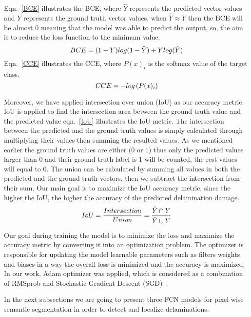 \documentclass[preprint,10pt]{elsarticle}
\begin{document}
Eqn.~\ref{BCE} illustrates the BCE, where \(\hat{Y}\) represents the predicted vector values and \(Y\) represents the ground truth vector values, when \(\hat{Y} \approx Y\) then the BCE will be almost \(0\) meaning that the model was able to predict the output, so, the aim is to reduce the loss function to the minimum value.
\begin{equation}
\footnotesize
	BCE = (1-Y)log(1-\hat{Y})+Ylog(\hat{Y})
	\label{BCE}
\end{equation}
Eqn.~\ref{CCE} illustrates the CCE, where \( P(x)_{i}\) is the softmax value of the target class. 
\begin{equation}
\footnotesize
CCE = -log\left( P(x)_{i} \right)
\label{CCE}
\end{equation}

Moreover, we have applied intersection over union (IoU) as our accuracy metric. 
IoU is applied to find the intersection area between the ground truth value and the predicted value eqn.~\ref{IoU} illustrates the IoU metric.
The intersection between the predicted and the ground truth values is simply calculated through multiplying their values then summing the resulted values.
As we mentioned earlier the ground truth values are either \((0\) or \(1)\) thus only the predicted values larger than \(0\) and their ground truth label is \(1\) will be counted, the rest values will equal to \(0\). 
The union can be calculated by summing all values in both the predicted and the ground truth  vectors, then we subtract the intersection from their sum.
Our main goal is to maximize the IoU accuracy metric, since the higher the IoU, the higher the accuracy of the predicted delamination damage.
\begin{equation}
\footnotesize
IoU = \frac{Intersection}{Union} = \frac{\hat{Y} \cap Y}{\hat{Y} \cup Y} 
\label{IoU}
\end{equation}

Our goal during training the model is to minimize the loss and maximize the accuracy metric by converting it into an optimization problem. 
The optimizer is responsible for updating the model learnable parameters such as filters weights and biases in a way the overall loss is minimized and the accuracy is maximized.
In our work, Adam optimizer was applied, which is considered as a combination of RMSprob and Stochastic Gradient Descent (SGD)~\cite{Kingma2015}. 

In the next subsections we are going to present three FCN models for pixel wise semantic segmentation in order to detect and localize delaminations.
\end{document}

